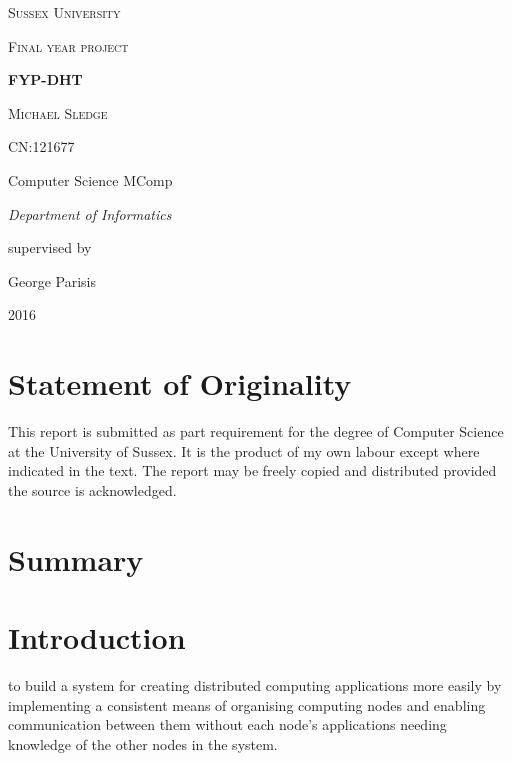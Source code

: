 \documentclass{article}
\begin{document}
\begin{titlepage}
	\centering
	{\scshape\LARGE Sussex University \par}
	\vspace{1cm}
	{\scshape\Large Final year project\par}
	\vspace{1.5cm}
	{\huge\bfseries FYP-DHT\par}
	\vspace{2cm}
	{\Large\scshape Michael Sledge\par}
	{\Large CN:121677\par}
	\vspace{1cm}
	{\Large Computer Science MComp\par}
	{\Large\itshape Department of Informatics\par}
	\vspace{1cm}
	supervised by\par
	George Parisis

	\vfill

	{\large 2016\par}
\end{titlepage}

\section{Statement of Originality}
This report is submitted as part requirement for the degree of Computer Science at the University of Sussex. It is the product of my own labour except where indicated in the text. The report may be freely copied and distributed provided the source is acknowledged.
\newpage

\section{Summary}


\newpage
\tableofcontents
\newpage


\section{Introduction}


to build a system for creating distributed computing applications more easily by implementing a consistent means of organising computing nodes and enabling communication between them without each node's applications needing knowledge of the other nodes in the system.
\end{document}
